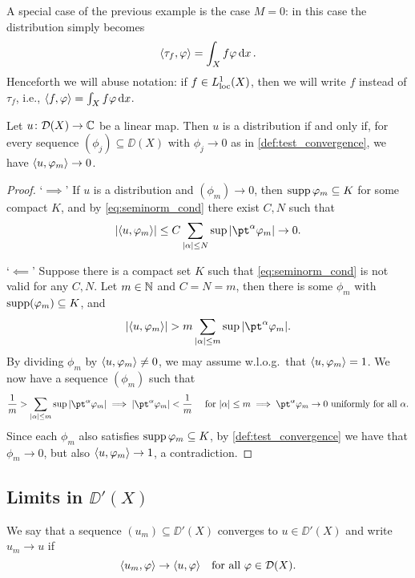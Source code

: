 A special case of the previous example is the case $M = 0$: in this case the distribution simply becomes
\[
\langle\tau_f, \varphi\rangle = \int_X f \varphi \dd{x}. 
\]
Henceforth we will abuse notation: if $f \in L^1_{\mathrm{loc}}(X)$, then we will write $f$ instead of $\tau_f$, i.e., $\langle f, \varphi\rangle = \int_X f\varphi \dd{x}$. 

\begin{lemma}
    Let $u \colon \mathcal D(X) \to \mathbb C$ be a linear map. Then $u$ is a distribution if and only if, for every sequence $(\phi_j) \subseteq \DD(X)$ with $\phi_j \to 0$ as in \cref{def:test_convergence}, we have $\langle u, \varphi_m\rangle \to 0$. 
\end{lemma}

\begin{proof}
    `$\implies$' If $u$ is a distribution and $(\phi_m) \to 0$, then $\operatorname{supp}\varphi_m \subseteq K$ for some compact $K$, and by \cref{eq:seminorm_cond} there exist $C, N$ such that
    \[
    \abs{\ang{u, \phi_m}} \leq C \sum_{\abs{\alpha} \leq N} \sup \abs{\pt^\alpha \phi_m} \to 0. 
    \]
    
    `$\impliedby$' Suppose there is a compact set $K$ such that \cref{eq:seminorm_cond} is not valid for any $C, N$. Let $m \in \mathbb N$ and $C = N = m$, then there is some $\phi_m$ with $\operatorname{supp}(\varphi_m) \subseteq K$, and 
    \[
    \abs{\ang{u, \phi_m}} > m \sum_{\abs{\alpha} \leq m} \sup \abs{\pt^\alpha \phi_m}. 
    \]
    By dividing $\phi_m$ by $\langle u, \varphi_m\rangle \neq 0$, we may assume w.l.o.g.\ that $\langle u, \varphi_m\rangle = 1$. 
    We now have a sequence $(\phi_m)$ such that
    \[
    \frac1m > \sum_{\abs{\alpha} \leq m} \sup \abs{\pt^\alpha \phi_m} \implies  \abs{\pt^\alpha \phi_m} < \frac1m \quad\text{ for $\abs{\alpha} \leq m$} \implies \pt^\alpha \phi_m \to 0 \text{ uniformly for all $\alpha$}. 
    \]
    Since each $\phi_m$ also satisfies $\operatorname{supp}\varphi_m\subseteq K$, by \cref{def:test_convergence} we have that $\phi_m \to 0$, but also $\langle u, \varphi_m\rangle \to 1$, a contradiction. 
\end{proof}

\subsection{Limits in $\DD'(X)$}
\begin{definition}
    We say that a sequence $(u_m) \subseteq \DD'(X)$ converges to $u \in \DD'(X)$ and write $u_m \to u$ if 
    \[
    \langle u_m, \varphi\rangle \to \langle u, \varphi\rangle \quad\text{for all $\varphi \in \mathcal D(X)$}. 
    \]
\end{definition}

